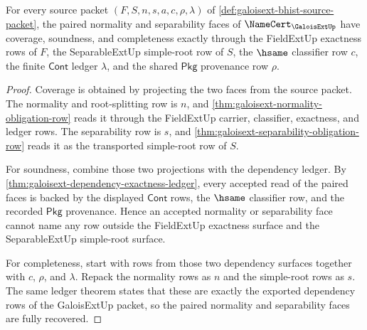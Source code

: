 \begin{theorem}
\label{thm:galoisext-normal-separable-combined-exactness}
For every source packet $(F,S,n,s,a,c,\rho,\lambda)$ of
\autoref{def:galoisext-bhist-source-packet}, the paired normality and
separability faces of $\NameCert_{\GaloisExtUp}$ have coverage, soundness, and
completeness exactly through the FieldExtUp exactness rows of $F$, the
SeparableExtUp simple-root row of $S$, the $\hsame$ classifier row $c$, the
finite $\mathsf{Cont}$ ledger $\lambda$, and the shared $\mathsf{Pkg}$
provenance row $\rho$.
\end{theorem}
\begin{proof}
Coverage is obtained by projecting the two faces from the source packet. The
normality and root-splitting row is $n$, and
\autoref{thm:galoisext-normality-obligation-row} reads it through the
FieldExtUp carrier, classifier, exactness, and ledger rows. The separability
row is $s$, and \autoref{thm:galoisext-separability-obligation-row} reads it as
the transported simple-root row of $S$.

For soundness, combine those two projections with the dependency ledger. By
\autoref{thm:galoisext-dependency-exactness-ledger}, every accepted read of
the paired faces is backed by the displayed $\mathsf{Cont}$ rows, the
$\hsame$ classifier row, and the recorded $\mathsf{Pkg}$ provenance. Hence an
accepted normality or separability face cannot name any row outside the
FieldExtUp exactness surface and the SeparableExtUp simple-root surface.

For completeness, start with rows from those two dependency surfaces together
with $c$, $\rho$, and $\lambda$. Repack the normality rows as $n$ and the
simple-root rows as $s$. The same ledger theorem states that these are exactly
the exported dependency rows of the GaloisExtUp packet, so the paired
normality and separability faces are fully recovered.
\end{proof}


